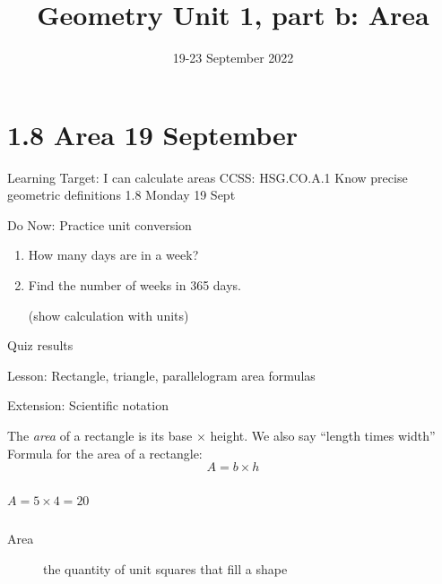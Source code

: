 \documentclass[onlytextwidth]{beamer}
\title{Geometry Unit 1, part b: Area}
\date{19-23 September 2022}
\begin{document}
\frame{\titlepage}

\section[Outline]{}
\frame{\tableofcontents}

\section{1.8 Area \hfill 19 September}
\begin{frame}{Learning Target: I can calculate areas}
  {CCSS: HSG.CO.A.1 Know precise geometric definitions \hfill \alert{1.8 Monday 19 Sept}}
  \begin{block}{Do Now: Practice unit conversion}
    \begin{enumerate}
        \item How many days are in a week?
        \item Find the number of weeks in 365 days. \par (show calculation with units)
    \end{enumerate}
    \end{block} \vspace{3cm}
    Quiz results \par \medskip
    Lesson: Rectangle, triangle, parallelogram area formulas \par \medskip
    Extension: Scientific notation
  \end{frame}

\begin{frame}{The \emph{area} of a rectangle is its base $\times$ height.}
    {We also say ``length times width''}
    Formula for the area of a rectangle:
    {\large $$A=b \times h$$}
        \begin{columns}
            $$A = 5 \times 4 = 20$$
        \end{columns} \vspace{1.5cm}
        \begin{description}
            \item[Area] the quantity of unit squares that fill a shape
        \end{description}
    \end{frame}
\end{document}
